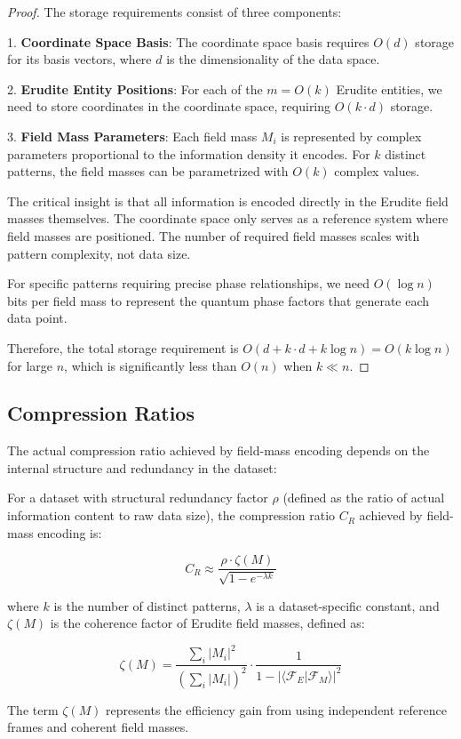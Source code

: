 \begin{proof}
The storage requirements consist of three components:

1. \textbf{Coordinate Space Basis}: The coordinate space basis requires $O(d)$ storage for its basis vectors, where $d$ is the dimensionality of the data space.

2. \textbf{Erudite Entity Positions}: For each of the $m = O(k)$ Erudite entities, we need to store coordinates in the coordinate space, requiring $O(k \cdot d)$ storage.

3. \textbf{Field Mass Parameters}: Each field mass $M_i$ is represented by complex parameters proportional to the information density it encodes. For $k$ distinct patterns, the field masses can be parametrized with $O(k)$ complex values.

The critical insight is that all information is encoded directly in the Erudite field masses themselves. The coordinate space only serves as a reference system where field masses are positioned. The number of required field masses scales with pattern complexity, not data size.

For specific patterns requiring precise phase relationships, we need $O(\log n)$ bits per field mass to represent the quantum phase factors that generate each data point.

Therefore, the total storage requirement is $O(d + k \cdot d + k \log n) = O(k \log n)$ for large $n$, which is significantly less than $O(n)$ when $k \ll n$.
\end{proof}

\subsection{Compression Ratios}

The actual compression ratio achieved by field-mass encoding depends on the internal structure and redundancy in the dataset:

\begin{proposition}
For a dataset with structural redundancy factor $\rho$ (defined as the ratio of actual information content to raw data size), the compression ratio $C_R$ achieved by field-mass encoding is:

\begin{equation}
C_R \approx \frac{\rho \cdot \zeta(M)}{\sqrt{1 - e^{-\lambda k}}}
\end{equation}

where $k$ is the number of distinct patterns, $\lambda$ is a dataset-specific constant, and $\zeta(M)$ is the coherence factor of Erudite field masses, defined as:

\begin{equation}
\zeta(M) = \frac{\sum_i |M_i|^2}{\left(\sum_i |M_i|\right)^2} \cdot \frac{1}{1 - |\langle \mathcal{F}_E|\mathcal{F}_M \rangle|^2}
\end{equation}

The term $\zeta(M)$ represents the efficiency gain from using independent reference frames and coherent field masses.
\end{proposition}

